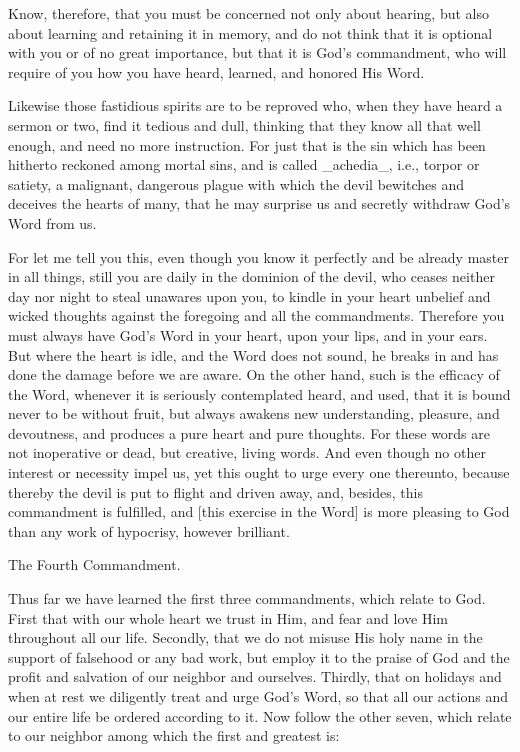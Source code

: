 Know, therefore, that you must be concerned not only about hearing, but
also about learning and retaining it in memory, and do not think that
it is optional with you or of no great importance, but that it is God's
commandment, who will require of you how you have heard, learned, and
honored His Word.

Likewise those fastidious spirits are to be reproved who, when they
have heard a sermon or two, find it tedious and dull, thinking that
they know all that well enough, and need no more instruction. For just
that is the sin which has been hitherto reckoned among mortal sins, and
is called _achedia_, i.e., torpor or satiety, a malignant, dangerous
plague with which the devil bewitches and deceives the hearts of many,
that he may surprise us and secretly withdraw God's Word from us.

For let me tell you this, even though you know it perfectly and be
already master in all things, still you are daily in the dominion of
the devil, who ceases neither day nor night to steal unawares upon you,
to kindle in your heart unbelief and wicked thoughts against the
foregoing and all the commandments. Therefore you must always have
God's Word in your heart, upon your lips, and in your ears. But where
the heart is idle, and the Word does not sound, he breaks in and has
done the damage before we are aware. On the other hand, such is the
efficacy of the Word, whenever it is seriously contemplated heard, and
used, that it is bound never to be without fruit, but always awakens
new understanding, pleasure, and devoutness, and produces a pure heart
and pure thoughts. For these words are not inoperative or dead, but
creative, living words. And even though no other interest or necessity
impel us, yet this ought to urge every one thereunto, because thereby
the devil is put to flight and driven away, and, besides, this
commandment is fulfilled, and [this exercise in the Word] is more
pleasing to God than any work of hypocrisy, however brilliant.

The Fourth Commandment.

Thus far we have learned the first three commandments, which relate to
God. First that with our whole heart we trust in Him, and fear and love
Him throughout all our life. Secondly, that we do not misuse His holy
name in the support of falsehood or any bad work, but employ it to the
praise of God and the profit and salvation of our neighbor and
ourselves. Thirdly, that on holidays and when at rest we diligently
treat and urge God's Word, so that all our actions and our entire life
be ordered according to it. Now follow the other seven, which relate to
our neighbor among which the first and greatest is:

